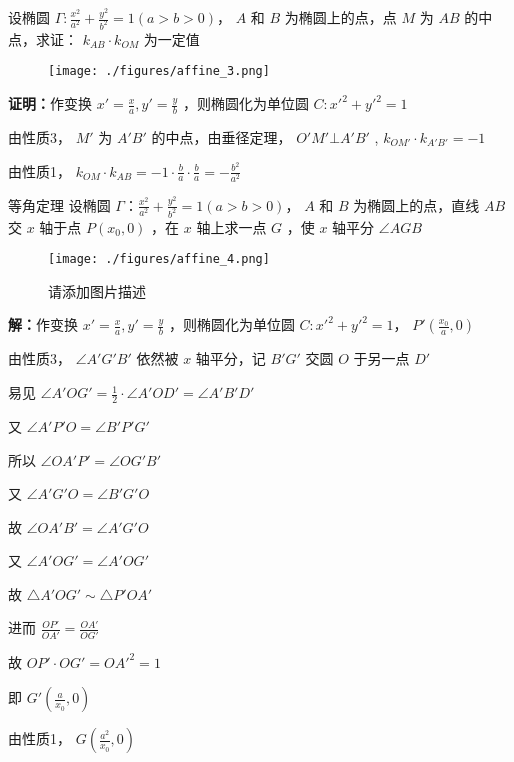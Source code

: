 \begin{corollary}{}
设椭圆 \(\Gamma:\frac{x^2}{a^2}+\frac{y^2}{b^2}=1(a>b>0)\)， \(A\) 和 \(B\) 为椭圆上的点，点 \(M\) 为 \(AB\) 的中点，求证： \(k_{AB}\cdot k_{OM}\) 为一定值

\begin{figure}[ht]
\centering
\texttt{[image: ./figures/affine\_3.png]}
\caption{} \label{affine_fig3}
\end{figure}

\textbf{证明：}作变换 \(x'=\frac{x}{a},y'=\frac{y}{b}\) ，则椭圆化为单位圆 \(C:x'^2+y'^2=1\)

由性质3， \(M'\) 为 \(A'B'\) 的中点，由垂径定理， \(O'M'\bot A'B'\) , \(k_{OM'}\cdot k_{A'B'}=-1\)

由性质1， \(k_{OM}\cdot k_{AB}=-1\cdot \frac{b}{a}\cdot \frac{b}{a}=-\frac{b^2}{a^2}\)

\end{corollary} 

\begin{corollary}{等角定理}
设椭圆 \(\Gamma：\frac{x^2}{a^2}+\frac{y^2}{b^2}=1(a>b>0)\)， \(A\) 和 \(B\) 为椭圆上的点，直线 \(AB\) 交 \(x\) 轴于点 \(P(x_0,0)\) ，在 \(x\) 轴上求一点 \(G\) ，使 \(x\) 轴平分 \(\angle AGB\) 

\begin{figure}[ht]
\centering
\texttt{[image: ./figures/affine\_4.png]}
\caption{请添加图片描述} \label{affine_fig4}
\end{figure}
\textbf{解：}作变换 \(x'=\frac{x}{a},y'=\frac{y}{b}\) ，则椭圆化为单位圆 \(C:x'^2+y'^2=1\)， \(P'\left(\frac{x_0}{a},0 \right)\) 

由性质3， \(\angle A'G'B'\) 依然被 \(x\) 轴平分，记 \(B'G'\) 交圆 \(O\) 于另一点 \(D'\)

易见 \(\angle A'OG'=\frac{1}{2}\cdot\angle A'OD'=\angle A'B'D'\) 

又 \(\angle A'P'O=\angle B'P'G'\)

所以 \(\angle OA'P'=\angle OG'B'\)

又 \(\angle A'G'O=\angle B'G'O\)

故 \(\angle OA'B'=\angle A'G'O\)

又 \(\angle A'OG'=\angle A'OG'\)

故 \(\triangle A'OG'\sim \triangle P'OA'\)

进而 \(\frac{OP'}{OA'}=\frac{OA'}{OG'}\)

故 \(OP'\cdot OG'=OA'^2=1\) 

即 \(G'\left(\frac{a}{x_0},0\right)\)

由性质1， \(G\left( \frac{a^2}{x_0},0\right)\) 

\end{corollary}

